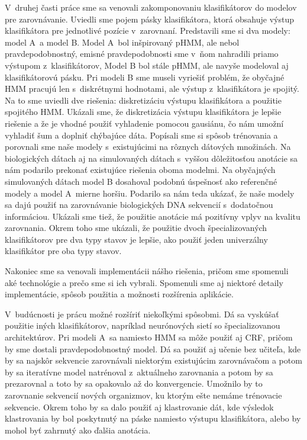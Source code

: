 V~druhej časti práce sme sa venovali zakomponovaniu klasifikátorov do modelov pre zarovnávanie. Uviedli sme pojem pásky klasifikátora, ktorá obsahuje výstup klasifikátora pre jednotlivé pozície v~zarovnaní. Predstavili sme si dva modely: model A~a model B.
Model A~bol inšpirovaný pHMM, ale nebol pravdepodobnostný, emisné pravdepodobnosti sme v~ňom nahradili priamo výstupom z~klasifikátorov,
Model B bol stále pHMM, ale navyše modeloval aj klasifikátorovú pásku.
Pri modeli B sme museli vyriešiť problém, že obyčajné HMM pracujú len s~diskrétnymi hodnotami, ale výstup z~klasifikátora je spojitý. Na to sme uviedli dve riešenia: diskretizáciu výstupu klasifikátora a použitie spojitého HMM.
Ukázali sme, že diskretizácia výstupu klasifikátora je lepšie riešenie a že je vhodné použiť vyhladenie pomocou gausiánu, čo nám umožní vyhladiť šum a doplniť chýbajúce dáta. Popísali sme si spôsob trénovania a porovnali sme naše modely s~existujúcimi na rôznych dátových množinách.
Na biologických dátach aj na simulovaných dátach s~vyššou dôležitosťou anotácie sa nám podarilo prekonať existujúce riešenia oboma modelmi. Na obyčajných simulovaných dátach model B dosahoval podobnú úspešnosť ako referenčné modely a model A~mierne horšiu. Podarilo sa nám teda ukázať, že naše modely sa dajú použiť na zarovnávanie biologických DNA sekvencií s~dodatočnou informáciou. Ukázali sme tiež, že použitie anotácie má pozitívny vplyv na kvalitu zarovnania. Okrem toho sme ukázali, že použitie dvoch špecializovaných klasifikátorov pre dva typy stavov je lepšie, ako použiť jeden univerzálny klasifikátor pre oba typy stavov.

Nakoniec sme sa venovali implementácii nášho riešenia, pričom sme spomenuli aké technológie a prečo sme si ich vybrali. Spomenuli sme aj niektoré detaily implementácie, spôsob použitia a možnosti rozšírenia aplikácie.

V~budúcnosti je prácu možné rozšíriť niekoľkými spôsobmi. Dá sa vyskúšať použitie iných klasifikátorov, napríklad neurónových sietí so špecializovanou architektúrov. Pri modeli A~sa namiesto HMM sa môže použiť aj CRF, pričom by sme dostali pravdepodobnostný model. Dá sa použiť aj učenie bez učiteľa, kde by sa najskôr sekvencie zarovnávali niektorým existujúcim zarovnávačom a potom by sa iteratívne model natrénoval z~aktuálneho zarovnania a potom by sa prezarovnal a toto by sa opakovalo až do konvergencie. Umožnilo by to zarovnanie sekvencií nových organizmov, ku ktorým ešte nemáme trénovacie sekvencie. Okrem toho by sa dalo použiť aj klastrovanie dát, kde výsledok klastrovania by bol poskytnutý na páske namiesto výstupu klasifikátora, alebo by mohol byť zahrnutý ako ďalšia anotácia.
